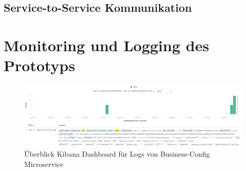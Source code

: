 \subsection{Service-to-Service Kommunikation}
\label{anhang_s2s_kommunikation}

\newpage



\clearpage

\section{Monitoring und Logging des Prototyps}
\begin{figure}[h]
	\begin{center}
		\includegraphics[width=16cm]{img/kibana_logs.PNG}
		\caption[Überblick Kibana Dashboard für Logs von Business-Config Microservice]{Überblick Kibana Dashboard für Logs von Business-Config Microservice}
		\label{anhang_grafik_kibana_dashboard}
	\end{center}
\end{figure}
